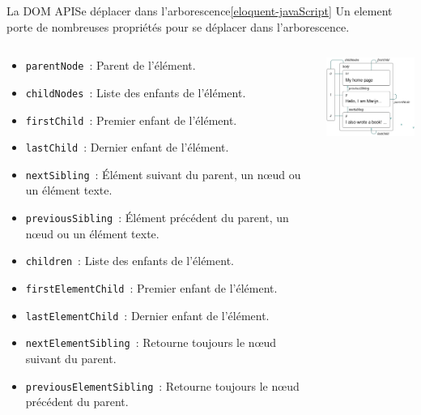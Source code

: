 \documentclass{beamer}
\begin{document}
    \begin{frame}{La DOM API}{Se déplacer dans l'arborescence\cref{eloquent-javaScript}}
        Un element porte de nombreuses propriétés pour se déplacer dans l'arborescence.
        \begin{columns}
            \begin{footnotesize}
                \begin{itemize}
                    \item \lstinline{parentNode}~: Parent de l'élément.
                    \item \lstinline{childNodes}~: Liste des enfants de l'élément.
                    \item \lstinline{firstChild}~: Premier enfant de l'élément.
                    \item \lstinline{lastChild}~: Dernier enfant de l'élément.
                    \item \lstinline{nextSibling}~: Élément suivant du parent, un nœud ou un élément texte.
                    \item \lstinline{previousSibling}~: Élément précédent du parent, un nœud ou un élément texte.
                    \item \lstinline{children}~: Liste des enfants de l'élément.
                    \item \lstinline{firstElementChild}~: Premier enfant de l'élément.
                    \item \lstinline{lastElementChild}~: Dernier enfant de l'élément.
                    \item \lstinline{nextElementSibling}~: Retourne toujours le nœud suivant du parent.
                    \item \lstinline{previousElementSibling}~: Retourne toujours le nœud précédent du parent.
                \end{itemize}
            \end{footnotesize}
            \center
            \includegraphics[width=4cm]{image/moving-in-the-tree}
        \end{columns}
    \end{frame}
\end{document}
